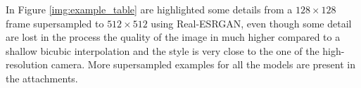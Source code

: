 In Figure \ref{img:example_table} are highlighted some details from a \(128\times128\) frame supersampled to \(512\times512\) using Real-ESRGAN, even though some detail are lost in the process the quality of the image in much higher compared to a shallow bicubic interpolation and the style is very close to the one of the high-resolution camera. More supersampled examples for all the models are present in the attachments.
